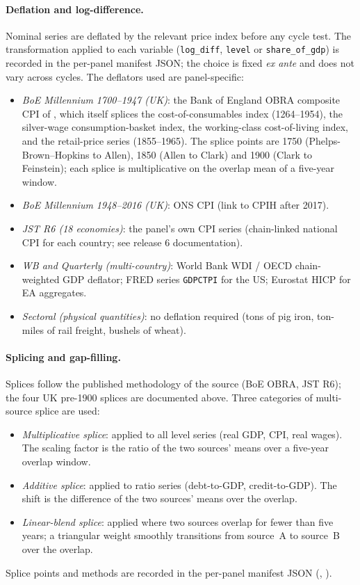 \paragraph{Deflation and log-difference.}
Nominal series are deflated by the relevant price index before
any cycle test. The transformation applied to each variable
(\texttt{log\_diff}, \texttt{level} or \texttt{share\_of\_gdp})
is recorded in the per-panel manifest JSON; the choice is fixed
\emph{ex ante} and does not vary across cycles. The deflators
used are panel-specific:
\begin{itemize}
\item \emph{BoE Millennium 1700--1947 (UK)}: the Bank of
  England OBRA composite CPI of \citet{thomas_dimsdale2017},
  which itself splices the
  \citet{phelps_brown_hopkins1956} cost-of-consumables index
  (1264--1954), the \citet{allen2001} silver-wage
  consumption-basket index, the \citet{clark2005}
  working-class cost-of-living index, and the
  \citet{feinstein1972} retail-price series (1855--1965). The
  splice points are 1750 (Phelps-Brown--Hopkins to Allen),
  1850 (Allen to Clark) and 1900 (Clark to Feinstein); each
  splice is multiplicative on the overlap mean of a five-year
  window.
\item \emph{BoE Millennium 1948--2016 (UK)}: ONS CPI (link to
  CPIH after 2017).
\item \emph{JST R6 (18 economies)}: the panel's own CPI series
  (chain-linked national CPI for each country; see
  \citet{jorda_schularick_taylor2017} release 6 documentation).
\item \emph{WB and Quarterly (multi-country)}: World Bank
  WDI / OECD chain-weighted GDP deflator; FRED series
  \texttt{GDPCTPI} for the US; Eurostat HICP for EA aggregates.
\item \emph{Sectoral (physical quantities)}: no deflation
  required (tons of pig iron, ton-miles of rail freight,
  bushels of wheat).
\end{itemize}

\paragraph{Splicing and gap-filling.}
Splices follow the published methodology of the source (BoE
OBRA, JST R6); the four UK pre-1900 splices are documented
above. Three categories of multi-source splice are used:
\begin{itemize}
\item \emph{Multiplicative splice}: applied to all level series
  (real GDP, CPI, real wages). The scaling factor is the ratio
  of the two sources' means over a five-year overlap window.
\item \emph{Additive splice}: applied to ratio series
  (debt-to-GDP, credit-to-GDP). The shift is the difference of
  the two sources' means over the overlap.
\item \emph{Linear-blend splice}: applied where two sources
  overlap for fewer than five years; a triangular weight
  smoothly transitions from source~A to source~B over the
  overlap.
\end{itemize}
Splice points and methods are recorded in the per-panel
manifest JSON (,
).


